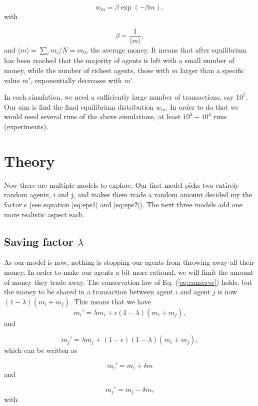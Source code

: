 \documentclass[10pt, a4paper]{article}
\begin{document}
\begin{equation*}
w_m=\beta \exp{(-\beta m)},
\end{equation*}
with

\begin{equation*}
\beta = \frac{1}{\langle m\rangle},
\end{equation*}
and $\langle m\rangle=\sum_i m_i/N=m_0$, the average money.
It means that after equilibrium has been reached that the majority of agents is left with a small
number of money, while the number of richest agents, those with $m$ larger than a specific value $m'$,
exponentially decreases with $m'$.

In each simulation, we need a sufficiently large number of transactions, say $10^7$. Our aim is find the final equilibrium distribution $w_m$. In order to do that we would need
several runs of the above simulations, at least $10^3-10^4$ runs (experiments).
\section{Theory}
Now there are multiple models to explore. Our first model picks two entirely random agents, i and j, and makes them trade a random amount decided my the factor $\epsilon$ (see equation \ref{eq:eps1} and \ref{eq:eps2}).
The next three models add one more realistic aspect each.
\subsection{Saving factor $\lambda$}
As our model is now, nothing is stopping our agents from throwing away all their money. In order to make our agents a bit more rational, we will limit the amount of money they trade away.
The conservation law of Eq. (\ref{eq:conserve}) holds, but the money to be shared in a transaction between
  agent $i$ and agent $j$ is now $(1-\lambda)(m_i+m_j)$. This means that we have
\begin{equation}
  m_i' = \lambda m_i+\epsilon(1-\lambda)(m_i+m_j),
  \end{equation}
  and

\begin{equation}
  m_j' = \lambda m_j+(1-\epsilon)(1-\lambda)(m_i+m_j),
  \end{equation}
  which can be written as

\begin{equation}
  m_i'=m_i+\delta m
  \end{equation}
  and

\begin{equation}
  m_j'=m_j-\delta m,
  \end{equation}
  with
\end{document}
